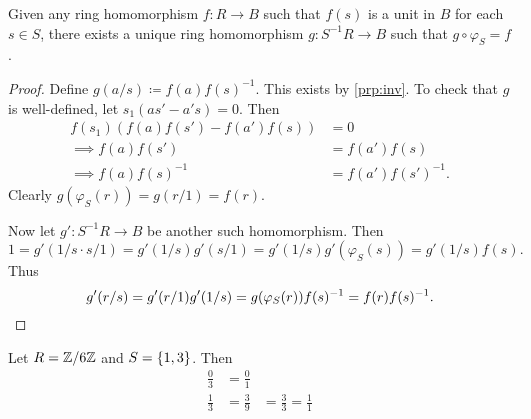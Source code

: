 \begin{proposition}
    Given any ring homomorphism $f\colon R \to B$ such that $f(s)$ is a
    unit in $B$ for each $s \in S$, there exists a unique ring homomorphism
    $g\colon S^{-1}R \to B$ such that $g \circ \varphi_S = f$.
\end{proposition}
\begin{proof}
    Define $g(a/s) \coloneq f(a) f(s)^{-1}$.
    This exists by \cref{prp:inv}.
    To check that $g$ is well-defined, let $s_1(as' - a's) = 0$.
    Then \begin{align*}
        f(s_1)(f(a) f(s') - f(a') f(s)) &= 0 \\
        \implies f(a) f(s') &= f(a') f(s) \\
        \implies f(a) f(s)^{-1} &= f(a') f(s')^{-1}.
    \end{align*}
    Clearly $g(\varphi_S(r)) = g(r/1) = f(r)$.

    Now let $g'\colon S^{-1}R \to B$ be another such homomorphism.
    Then
    \[
        1 = g'(1/s \cdot s/1) = g'(1/s) g'(s/1) = g'(1/s) g'(\varphi_S(s))
        = g'(1/s) f(s).
    \] Thus \[
        g'(r/s) = g'(r/1) g'(1/s) = g(\varphi_S(r)) f(s)^{-1}
        = f(r) f(s)^{-1}. \qedhere
    \]
\end{proof}

\begin{example}
    Let $R = \mathbb{Z}/6\mathbb{Z}$ and $S = \{1, 3\}$.
    Then \begin{align*}
        \frac03 &= \frac01 \\
        \frac13 &= \frac39 &= \frac33 = \frac11 \\
    \end{align*}
\end{example}
